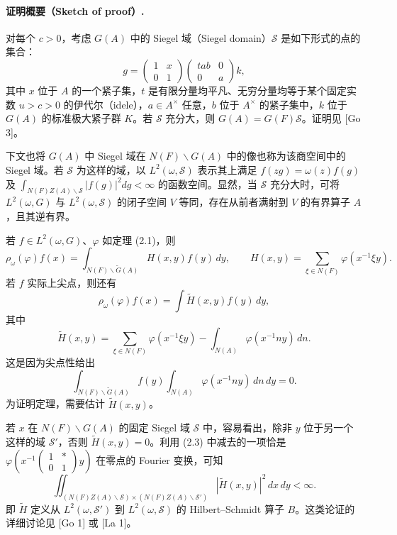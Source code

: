 \paragraph*{证明概要（Sketch of proof）.}
对每个 $c>0$，考虑 $G(A)$ 中的 Siegel 域（Siegel domain）$\mathcal S$ 是如下形式的点的集合：
\[
 g=\begin{pmatrix}1&x\\0&1\end{pmatrix}
 \begin{pmatrix}tab&0\\0&a\end{pmatrix}k,
\]
其中 $x$ 位于 $A$ 的一个紧子集，$t$ 是有限分量均平凡、无穷分量均等于某个固定实数
$u>c>0$ 的伊代尔（idele），$a\in A^\times$ 任意，$b$ 位于 $A^\times$ 的紧子集中，$k$ 位于 $G(A)$ 的标准极大紧子群 $K$。若 $\mathcal S$ 充分大，则
$G(A)=G(F)\mathcal S$。证明见 [Go 3]。

下文也将 $G(A)$ 中 Siegel 域在 $N(F)\backslash G(A)$ 中的像也称为该商空间中的 Siegel 域。若 $\mathcal S$ 为这样的域，以 $L^2(\omega,\mathcal S)$ 表示其上满足
$f(zg)=\omega(z)f(g)$ 及
$\int_{N(F)Z(A)\backslash\mathcal S}|f(g)|^2dg<\infty$ 的函数空间。显然，当
$\mathcal S$ 充分大时，可将 $L^2(\omega,G)$ 与 $L^2(\omega,\mathcal S)$ 的闭子空间 $V$ 等同，存在从前者满射到 $V$ 的有界算子 $A$，且其逆有界。

若 $f\in L^2(\omega,G)$、$\varphi$ 如定理 (2.1)，则
\[
 \rho_\omega(\varphi)f(x)=\int_{N(F)\backslash\widetilde G(A)}H(x,y)f(y)\,dy,
 \qquad H(x,y)=\sum_{\xi\in N(F)}\varphi(x^{-1}\xi y).
\]
若 $f$ 实际上尖点，则还有
\begin{equation}
 \rho_\omega(\varphi)f(x)=\int\widetilde H(x,y)f(y)\,dy,\tag{2.2}
\end{equation}
其中
\begin{equation}
 \widetilde H(x,y)=\sum_{\xi\in N(F)}\varphi(x^{-1}\xi y)
 -\int_{N(A)}\varphi(x^{-1}ny)\,dn.\tag{2.3}
\end{equation}
这是因为尖点性给出
\[
 \int_{N(F)\backslash\widetilde G(A)}f(y)
 \int_{N(A)}\varphi(x^{-1}ny)\,dn\,dy=0.
\]
为证明定理，需要估计 $\widetilde H(x,y)$。

若 $x$ 在 $N(F)\backslash G(A)$ 的固定 Siegel 域 $\mathcal S$ 中，容易看出，除非 $y$ 位于另一个这样的域 $\mathcal S'$，否则 $\widetilde H(x,y)=0$。利用 (2.3) 中减去的一项恰是
$\varphi(x^{-1}\left(\begin{smallmatrix}1&*\\0&1\end{smallmatrix}\right)y)$ 在零点的 Fourier 变换，可知
\[
 \iint_{(N(F)Z(A)\backslash\mathcal S)\times(N(F)Z(A)\backslash\mathcal S')}
 |\widetilde H(x,y)|^2\,dx\,dy<\infty.
\]
即 $\widetilde H$ 定义从 $L^2(\omega,\mathcal S')$ 到 $L^2(\omega,\mathcal S)$ 的
Hilbert--Schmidt 算子 $B$。这类论证的详细讨论见 [Go 1] 或 [La 1]。

